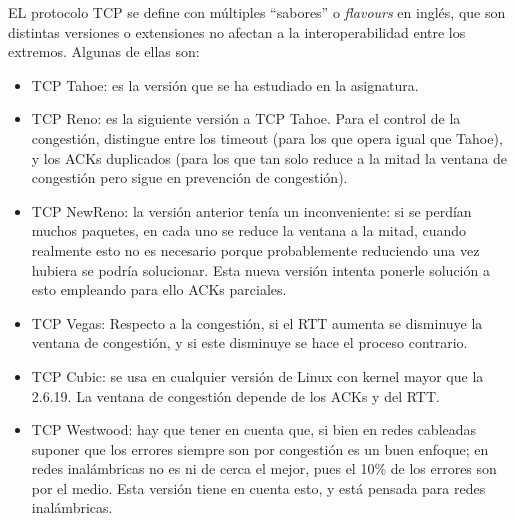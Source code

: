 EL protocolo \acrshort{TCP} se define con múltiples ``sabores'' o \textit{flavours} en inglés, que son distintas versiones o extensiones no afectan a la interoperabilidad entre los extremos.  Algunas de ellas son:
\begin{itemize}
    \item \acrshort{TCP} Tahoe: es la versión que se ha estudiado en la asignatura.
    \item \acrshort{TCP} Reno: es la siguiente versión a \acrshort{TCP} Tahoe. Para el control de la congestión, distingue entre los timeout (para los que opera igual que Tahoe), y los \acrshort{ACK}s duplicados (para los que tan solo reduce a la mitad la ventana de congestión pero sigue en prevención de congestión). 
    \item \acrshort{TCP} NewReno: la versión anterior tenía un inconveniente: si se perdían muchos paquetes, en cada uno se reduce la ventana a la mitad, cuando realmente esto no es necesario porque probablemente reduciendo una vez hubiera se podría solucionar. Esta nueva versión intenta ponerle solución a esto empleando para ello \acrshort{ACK}s parciales. 
    \item \acrshort{TCP} Vegas: Respecto a la congestión, si el \acrshort{RTT} aumenta se disminuye la ventana de congestión, y si este disminuye se hace el proceso contrario.
    \item \acrshort{TCP} Cubic: se usa en cualquier versión de Linux con kernel mayor que la 2.6.19. La ventana de congestión depende de los \acrshort{ACK}s y del \acrshort{RTT}. 
    \item \acrshort{TCP} Westwood: hay que tener en cuenta que, si bien en redes cableadas suponer que los errores siempre son por congestión es un buen enfoque; en redes inalámbricas no es ni de cerca el mejor, pues el 10\% de los errores son por el medio. Esta versión tiene en cuenta esto, y está pensada para redes inalámbricas.
\end{itemize}
